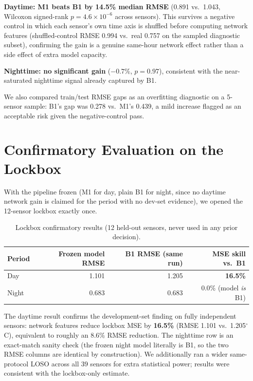 \documentclass[11pt]{article}
\begin{document}
\textbf{Daytime: M1 beats B1 by 14.5\% median RMSE} (0.891 vs.\ 1.043,
Wilcoxon signed-rank $p = 4.6\times10^{-6}$ across sensors). This survives a
negative control in which each sensor's own time axis is shuffled before
computing network features (shuffled-control RMSE 0.994 vs.\ real 0.757 on
the sampled diagnostic subset), confirming the gain is a
genuine same-hour network effect rather than a side effect of extra model
capacity.

\textbf{Nighttime: no significant gain} ($-0.7\%$, $p = 0.97$), consistent
with the near-saturated nighttime signal already captured by B1.

We also compared train/test RMSE gaps as an overfitting diagnostic on a
5-sensor sample: B1's gap was 0.278 vs.\ M1's 0.439, a mild increase flagged
as an acceptable risk given the negative-control pass.

\section{Confirmatory Evaluation on the Lockbox}

With the pipeline frozen (M1 for day, plain B1 for night, since no daytime
network gain is claimed for the period with no dev-set evidence), we opened
the 12-sensor lockbox exactly once.

\begin{table}[H]
  \centering
  \caption{Lockbox confirmatory results (12 held-out sensors, never used in
  any prior decision).}
  \label{tab:lockbox}
  \begin{tabular}{lrrr}
    \toprule
    Period & Frozen model RMSE & B1 RMSE (same run) & MSE skill vs.\ B1 \\
    \midrule
    Day   & 1.101 & 1.205 & \textbf{16.5\%} \\
    Night & 0.683 & 0.683 & 0.0\% (model \emph{is} B1) \\
    \bottomrule
  \end{tabular}
\end{table}

The daytime result confirms the development-set finding on fully
independent sensors: network features reduce lockbox MSE by
\textbf{16.5\%} (RMSE 1.101 vs.\ 1.205$^\circ$C), equivalent to roughly an
8.6\% RMSE reduction. The nighttime row is an exact-match sanity check (the
frozen night model literally is B1, so the two RMSE columns are identical by
construction). We additionally ran a wider same-protocol LOSO across all 39
sensors for extra statistical power; results were consistent with the
lockbox-only estimate.
\end{document}

